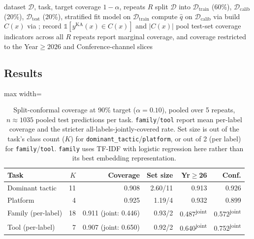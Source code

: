 \documentclass[preprint,12pt]{elsarticle}
\newenvironment{fittable}{\begin{adjustbox}{max width=\textwidth}}{\end{adjustbox}}
\begin{document}
\begin{algorithm}[htbp]
\caption{Split conformal calibration and coverage evaluation}
\label{alg:conformal}
\begin{algorithmic}[1]
\Require dataset $\mathcal{D}$, task, target coverage $1-\alpha$, repeats $R$
  \State split $\mathcal{D}$ into $\mathcal{D}_{\mathrm{train}}$ (60\%), $\mathcal{D}_{\mathrm{calib}}$ (20\%), $\mathcal{D}_{\mathrm{test}}$ (20\%), stratified
  \State fit model on $\mathcal{D}_{\mathrm{train}}$
  \State compute $\hat q$ on $\mathcal{D}_{\mathrm{calib}}$ via 
    \State build $C(x)$ via ; record $\mathbb{1}[y^{\mathrm{KA}}(x) \in C(x)]$ and $|C(x)|$
  \EndFor
\EndFor
\State pool test-set coverage indicators across all $R$ repeats
\State report marginal coverage, and coverage restricted to the Year${\geq}2026$ and Conference-channel slices
\end{algorithmic}
\end{algorithm}

\subsection{Results}
\label{sec:conformal-results}
\begin{table}[htbp]
\centering
\caption{Split-conformal coverage at 90\% target ($\alpha{=}0.10$), pooled
  over 5 repeats, $n{\approx}1035$ pooled test predictions per task.
  \texttt{family}/\texttt{tool} report mean per-label coverage and the
  stricter all-labels-jointly-covered rate. Set size is out of the
  task's class count ($K$) for \texttt{dominant\_tactic}/\texttt{platform},
  or out of 2 (per label) for \texttt{family}/\texttt{tool}. \texttt{family}
  uses TF-IDF with logistic regression here rather than its best
  embedding representation.}
\label{tab:conformal}
\begin{fittable}
\begin{tabular}{lrrrrr}
\toprule
Task & $K$ & Coverage & Set size & Yr$\geq$26 & Conf. \\
\midrule
Dominant tactic & 11 & 0.908 & 2.60/11 & 0.913 & 0.926 \\
Platform          &  4 & 0.925 & 1.19/4  & 0.932 & 0.899 \\
Family (per-label)  & 18 & 0.911 (joint: 0.446) & 0.93/2 & 0.487\textsuperscript{joint} & 0.572\textsuperscript{joint} \\
Tool (per-label)    &  7 & 0.907 (joint: 0.650) & 0.92/2 & 0.640\textsuperscript{joint} & 0.752\textsuperscript{joint} \\
\bottomrule
\end{tabular}
\end{fittable}
\end{table}
\end{document}
